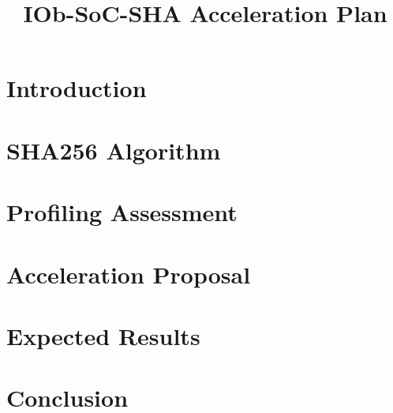 \documentclass{plan}
\title{IOb-SoC-SHA Acceleration  Plan}
\begin{document}
\maketitle
\cleardoublepage
\tableofcontents
\listoftables
\listoffigures
\cleardoublepage

\section{Introduction}
\label{sec:intro}


\section{SHA256 Algorithm}
\label{sec:sha256}


\section{Profiling Assessment}
\label{sec:profiling}


\section{Acceleration Proposal}
\label{sec:accel_proposal}


\section{Expected Results}
\label{sec:expected_results}


\section{Conclusion}
\label{sec:conclusion}


{}


\end{document}
